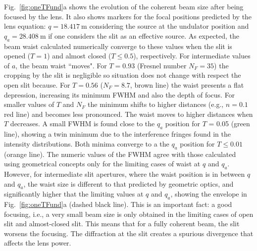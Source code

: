 \documentclass[9pt,twocolumn,twoside]{osajnl}
\begin{document}
Fig.~\ref{fig:oneTFund}a shows the evolution of the coherent beam size after being focused by the lens. It also shows markers for the focal positions predicted by the lens equation:  $q=\SI{18.417}{\meter}$ considering the source at the undulator position and $q_a=\SI{28.408}{\meter}$ if one considers the slit as an effective source. As expected, the beam waist calculated numerically converge to these values when the slit is opened ($T = 1$) and almost closed ($T \le 0.5$), respectively. For intermediate values of $a$, the beam waist ``moves". For $T=0.93$ (Fresnel number $N_F=35$) the cropping by the slit is negligible so situation does not change with respect the open slit because. For $T=0.56$ ($N_F=8.7$, brown line) the waist presents a flat depression, increasing its minimum FWHM and also the depth of focus. For smaller values of $T$ and $N_F$ the minimum shifts to higher distances (e.g., $n=0.1$ red line) and becomes less pronounced. The waist moves to higher distances when $T$ decreases. A small FWHM is found close to the $q_a$ position for $T$ = 0.05 (green line), showing a twin minimum due to the interference fringes found in the intensity distributions. Both minima converge to a the $q_a$ position for $T\le0.01$ (orange line). 
The numeric values of the FWHM agree with those calculated using geometrical concepts only for the limiting cases of waist at $q$ and $q_a$. 
However, for intermediate slit apertures, where the waist position is in between $q$ and $q_a$, the waist size is different to that predicted by geometric optics, and significantly higher that the limiting values at $q$ and $q_a$, showing the envelope in Fig.~\ref{fig:oneTFund}a (dashed black line).
This is an important fact: a good focusing, i.e., a very small beam size is only obtained in the limiting cases of open slit and almost-closed slit. This means that for a fully coherent beam, the slit worsens the focusing. The diffraction at the slit creates a spurious divergence that affects the lens power. 
\end{document}
